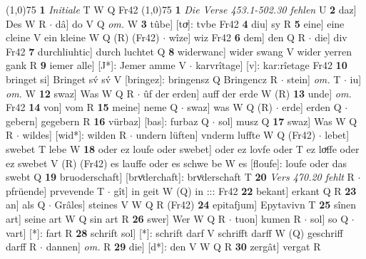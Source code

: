 \documentclass[8pt,a4paper,notitlepage]{article}
\begin{document}
\begin{table}[ht]
\begin{minipage}[t]{0.5\linewidth}
\line(1,0){75} \newline
\textbf{1} \textit{Initiale} T W Q Fr42  \newline
\line(1,0){75} \newline
\textbf{1} \textit{Die Verse 453.1-502.30 fehlen} U  \textbf{2} daz] Des W R  $\cdot$ dâ] do V Q \textit{om.} W \textbf{3} tûbe] [toͮ]: tvbe Fr42 \textbf{4} diu] sy R \textbf{5} eine] eine cleine V ein kleine W Q (R) (Fr42)  $\cdot$ wîze] wiz Fr42 \textbf{6} dem] den Q R  $\cdot$ die] div Fr42 \textbf{7} durchliuhtic] durch luchtet Q \textbf{8} widerwanc] wider swang V wider yerren gank R \textbf{9} iemer alle] [J*]: Jemer amme V  $\cdot$ karvrîtage] [v]: kar:rîetage Fr42 \textbf{10} bringet si] Bringet sv́ sv́ V [bringez]: bringensz Q Bringencz R  $\cdot$ stein] \textit{om.} T  $\cdot$ iu] \textit{om.} W \textbf{12} swaz] Was W Q R  $\cdot$ ûf der erden] auff der erde W (R) \textbf{13} unde] \textit{om.} Fr42 \textbf{14} von] vom R \textbf{15} meine] neme Q  $\cdot$ swaz] was W Q (R)  $\cdot$ erde] erden Q  $\cdot$ gebern] gegebern R \textbf{16} vürbaz] [bas]: furbaz Q  $\cdot$ sol] musz Q \textbf{17} swaz] Was W Q R  $\cdot$ wildes] [wid*]: wilden R  $\cdot$ undern lüften] vnderm luffte W Q (Fr42)  $\cdot$ lebet] swebet T lebe W \textbf{18} oder ez loufe oder swebet] oder ez lovfe oder T ez loͮffe oder ez swebet V (R) (Fr42) es lauffe oder es schwe be W es [floufe]: loufe oder das swebt Q \textbf{19} bruoderschaft] [brvͦderchaft]: brvͦderschaft T \textbf{20} \textit{Vers 470.20 fehlt} R   $\cdot$ pfrüende] prvevende T  $\cdot$ gît] in geit W (Q) in ::: Fr42 \textbf{22} bekant] erkant Q R \textbf{23} an] als Q  $\cdot$ Grâles] steines V W Q R (Fr42) \textbf{24} epitafjum] Epytavivn T \textbf{25} sînen art] seine art W Q sin art R \textbf{26} swer] Wer W Q R  $\cdot$ tuon] kumen R  $\cdot$ sol] so Q  $\cdot$ vart] [*]: fart R \textbf{28} schrift sol] [*]: schrift darf V schrifft darff W (Q) geschriff darff R  $\cdot$ dannen] \textit{om.} R \textbf{29} die] [d*]: den V W Q R \textbf{30} zergât] vergat R \newline
\end{minipage}
\end{table}
\end{document}
